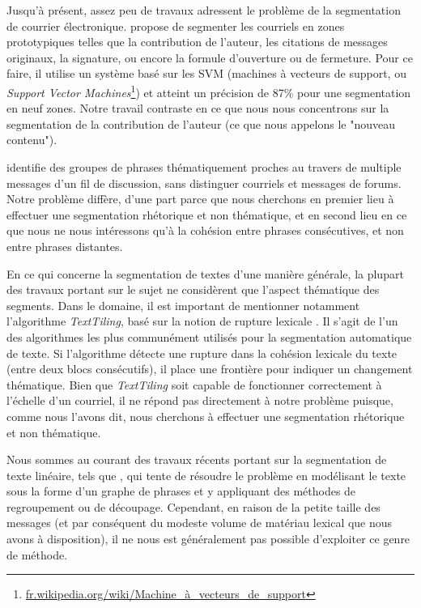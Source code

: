 Jusqu'à présent, assez peu de travaux adressent le problème de la segmentation de courrier électronique. \cite{lampert:2009:emnlp} propose de segmenter les courriels en zones prototypiques telles que la contribution de l'auteur, les citations de messages originaux, la signature, ou encore la formule d'ouverture ou de fermeture. Pour ce faire, il utilise un système basé sur les SVM (machines à vecteurs de support, ou \textit{Support Vector Machines}\footnote{\url{fr.wikipedia.org/wiki/Machine_à_vecteurs_de_support}}) et atteint un précision de 87\% pour une segmentation en neuf zones. Notre travail contraste en ce que nous nous concentrons sur la segmentation de la contribution de l'auteur (ce que nous appelons le "nouveau contenu").

\cite{joty:2013:jair} identifie des groupes de phrases thématiquement proches au travers de multiple messages d'un fil de discussion, sans distinguer courriels et messages de forums. Notre problème diffère, d'une part parce que nous cherchons en premier lieu à effectuer une segmentation rhétorique et non thématique, et en second lieu en ce que nous ne nous intéressons qu'à la cohésion entre phrases consécutives, et non entre phrases distantes.

En ce qui concerne la segmentation de textes d'une manière générale, la plupart des travaux portant sur le sujet ne considèrent que l'aspect thématique des segments. Dans le domaine, il est important de mentionner notamment l'algorithme \textit{TextTiling}, basé sur la notion de rupture lexicale \cite{hearst1997texttiling}. Il s'agit de l'un des algorithmes les plus communément utilisés pour la segmentation automatique de texte. Si l'algorithme détecte une rupture dans la cohésion lexicale du texte (entre deux blocs consécutifs), il place une frontière pour indiquer un changement thématique. Bien que \textit{TextTiling} soit capable de fonctionner correctement à l'échelle d'un courriel, il ne répond pas directement à notre problème puisque, comme nous l'avons dit, nous cherchons à effectuer une segmentation rhétorique et non thématique.

Nous sommes au courant des travaux récents portant sur la segmentation de texte linéaire, tels que \cite{kazantseva:2011}, qui tente de résoudre le problème en modélisant le texte sous la forme d'un graphe de phrases et y appliquant des méthodes de regroupement ou de découpage. Cependant, en raison de la petite taille des messages (et par conséquent du modeste volume de matériau lexical que nous avons à disposition), il ne nous est généralement pas possible d'exploiter ce genre de méthode.

